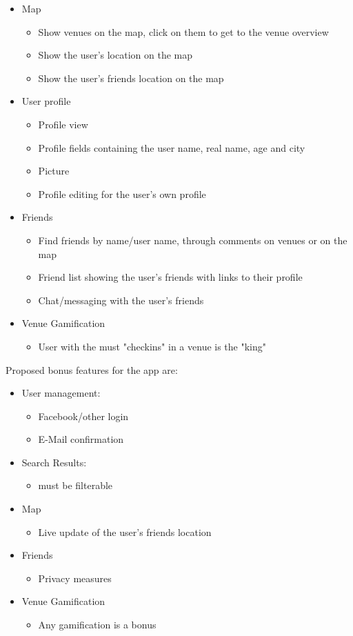 \begin{itemize}
	\item Map
	\begin{itemize}
		\item Show venues on the map, click on them to get to the venue overview
		\item Show the user's location on the map
		\item Show the user's friends location on the map
	\end{itemize}
	\item User profile
	\begin{itemize}
		\item Profile view
		\item Profile fields containing the user name, real name, age and city
		\item Picture
		\item Profile editing for the user's own profile
	\end{itemize}
	\item Friends
	\begin{itemize}
		\item Find friends by name/user name, through comments on venues or on the map
		\item Friend list showing the user's friends with links to their profile
		\item Chat/messaging with the user's friends
	\end{itemize}
	\item Venue Gamification
	\begin{itemize}
		\item User with the must "checkins" in a venue is the "king"
	\end{itemize}
\end{itemize}

Proposed bonus features for the app are:
\begin{itemize}
	\item User management:
	\begin{itemize}
		\item Facebook/other login
		\item E-Mail confirmation
	\end{itemize}
	\item Search Results:
	\begin{itemize}
		\item must be filterable
	\end{itemize}
	\item Map
	\begin{itemize}
		\item Live update of the user's friends location
	\end{itemize}
	\item Friends
	\begin{itemize}
		\item Privacy measures
	\end{itemize}
	\item Venue Gamification
	\begin{itemize}
		\item Any gamification is a bonus
	\end{itemize}
\end{itemize}

